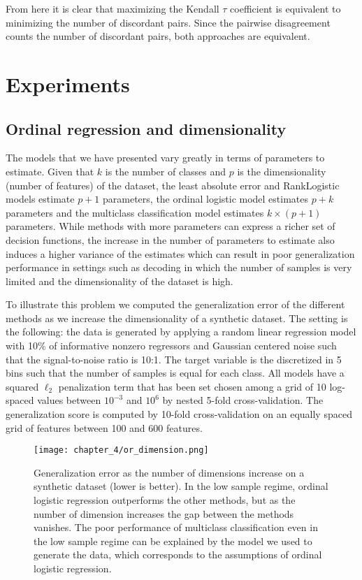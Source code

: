 From here it is clear that maximizing the Kendall $\tau$ coefficient is equivalent to minimizing the number of discordant pairs. Since the pairwise disagreement counts the number of discordant pairs, both approaches are equivalent.



%
\section{Experiments}\label{section:results}


\subsection{Ordinal regression and dimensionality}

The models that we have presented vary greatly in terms of parameters to estimate. Given that $k$ is the number of classes and $p$ is the dimensionality (number of features) of the dataset, the least absolute error and RankLogistic models estimate $p + 1$ parameters, the ordinal logistic model estimates $p + k$ parameters and the multiclass classification model estimates $k \times (p+1)$ parameters. While methods with more parameters can express a richer set of decision functions, the increase in the number of parameters to estimate also induces a higher variance of the estimates which can result in poor generalization performance in settings such as decoding in which the number of samples is very limited and the dimensionality of the dataset is high.

To illustrate this problem we computed the generalization error of the different methods as we increase the dimensionality of a synthetic dataset. The setting is the following: the data is generated by applying a random linear regression model with 10\% of informative nonzero regressors and Gaussian centered noise such that the signal-to-noise ratio is 10:1. The target variable is the discretized in 5 bins such that the number of samples is equal for each class. All models have a squared $\ell_2$ penalization term that has been set chosen among a grid of 10 log-spaced values between $10^{-3}$ and $10^6$  by nested 5-fold cross-validation. The generalization score is computed by 10-fold cross-validation on an equally spaced grid of features between 100 and 600 features. 

\begin{figure}
\texttt{[image: chapter\_4/or\_dimension.png]}
\caption{Generalization error as the number of dimensions increase on a synthetic dataset (lower is better). In the low sample regime, ordinal logistic regression outperforms the other methods, but as the number of dimension increases the gap between the methods vanishes.
The poor performance of multiclass classification even in the low sample regime can be explained by the model we used to generate the data, which corresponds to the assumptions of ordinal logistic regression.}\label{fig:or_dimension}
\end{figure}


